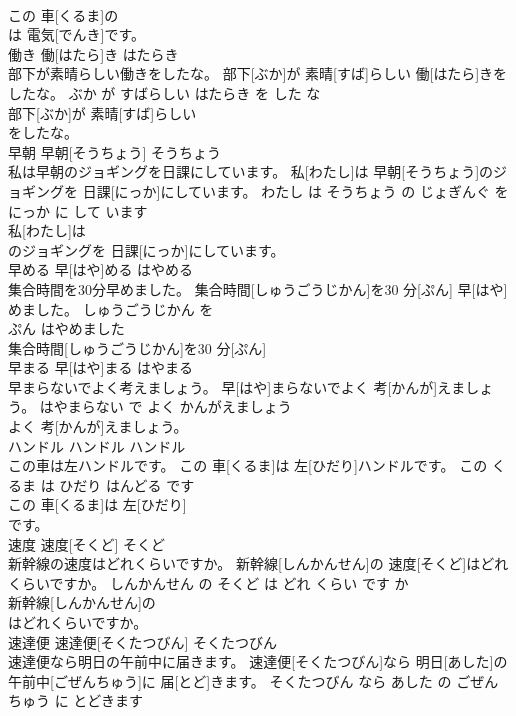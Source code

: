 \documentclass[8pt]{extreport}
\begin{document}
\begin{CJK}{UTF8}{min}
\\	この 車[くるま]の
\\	は 電気[でんき]です。			
\\	働き	働[はたら]き	はたらき	
\\	部下が素晴らしい働きをしたな。	部下[ぶか]が 素晴[すば]らしい 働[はたら]きをしたな。	ぶか が すばらしい はたらき を した な	
\\	部下[ぶか]が 素晴[すば]らしい
\\	をしたな。			
\\	早朝	早朝[そうちょう]	そうちょう	
\\	私は早朝のジョギングを日課にしています。	私[わたし]は 早朝[そうちょう]のジョギングを 日課[にっか]にしています。	わたし は そうちょう の じょぎんぐ を にっか に して います	
\\	私[わたし]は
\\	のジョギングを 日課[にっか]にしています。			
\\	早める	早[はや]める	はやめる	
\\	集合時間を30分早めました。	集合時間[しゅうごうじかん]を30 分[ぷん] 早[はや]めました。	しゅうごうじかん を 
\\	ぷん はやめました	
\\	集合時間[しゅうごうじかん]を30 分[ぷん]
\\	早まる	早[はや]まる	はやまる	
\\	早まらないでよく考えましょう。	早[はや]まらないでよく 考[かんが]えましょう。	はやまらない で よく かんがえましょう	
\\	よく 考[かんが]えましょう。			
\\	ハンドル	ハンドル	ハンドル	
\\	この車は左ハンドルです。	この 車[くるま]は 左[ひだり]ハンドルです。	この くるま は ひだり はんどる です	
\\	この 車[くるま]は 左[ひだり]
\\	です。			
\\	速度	速度[そくど]	そくど	
\\	新幹線の速度はどれくらいですか。	新幹線[しんかんせん]の 速度[そくど]はどれくらいですか。	しんかんせん の そくど は どれ くらい です か	
\\	新幹線[しんかんせん]の
\\	はどれくらいですか。			
\\	速達便	速達便[そくたつびん]	そくたつびん	
\\	速達便なら明日の午前中に届きます。	速達便[そくたつびん]なら 明日[あした]の 午前中[ごぜんちゅう]に 届[とど]きます。	そくたつびん なら あした の ごぜんちゅう に とどきます	

\end{CJK}
\end{document}
